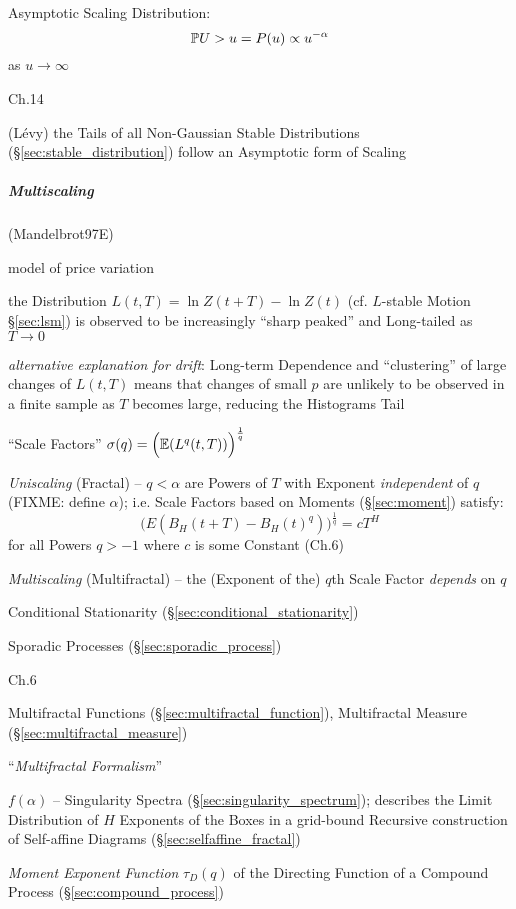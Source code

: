 Asymptotic Scaling Distribution:
\[
  \mathbb{P}{U > u} = P(u) \propto u^{-\alpha}
\]
as $u \to \infty$

Ch.14

(L\'evy) the Tails of all Non-Gaussian Stable Distributions
(\S\ref{sec:stable_distribution}) follow an Asymptotic form of Scaling



\subparagraph{Multiscaling}\label{sec:multiscaling}\hfill

(Mandelbrot97E)

model of price variation

the Distribution $L(t, T) = \ln Z(t + T) - \ln Z(t)$ (cf. $L$-stable Motion
\S\ref{sec:lsm}) is observed to be increasingly ``sharp peaked'' and Long-tailed
as $T \to 0$

\emph{alternative explanation for drift}: Long-term Dependence and
``clustering'' of large changes of $L(t, T)$ means that changes of small $p$ are
unlikely to be observed in a finite sample as $T$ becomes large, reducing the
Histograms Tail

``Scale Factors'' $\sigma(q) = \Big(\mathbb{E}(L^q(t, T))\Big)^{\frac{1}{q}}$

\emph{Uniscaling} (Fractal) -- $q < \alpha$ are Powers of $T$ with Exponent
\emph{independent} of $q$ (FIXME: define $\alpha$); i.e. Scale Factors based on
Moments (\S\ref{sec:moment}) satisfy:
\[
  \Big(E(B_H(t + T) - B_H(t)^q)\Big)^{\frac{1}{q}} = c T^H
\]
for all Powers $q > -1$ where $c$ is some Constant (Ch.6)

\emph{Multiscaling} (Multifractal) -- the (Exponent of the) $q$th Scale Factor
\emph{depends} on $q$

\fist Conditional Stationarity (\S\ref{sec:conditional_stationarity})

\fist Sporadic Processes (\S\ref{sec:sporadic_process})

Ch.6

Multifractal Functions (\S\ref{sec:multifractal_function}), Multifractal Measure
(\S\ref{sec:multifractal_measure})

``\emph{Multifractal Formalism}''

$f(\alpha)$ -- Singularity Spectra (\S\ref{sec:singularity_spectrum}); describes
the Limit Distribution of $H$ Exponents of the Boxes in a grid-bound Recursive
construction of Self-affine Diagrams (\S\ref{sec:selfaffine_fractal})

\emph{Moment Exponent Function} $\tau_D(q)$ of the Directing Function of a
Compound Process (\S\ref{sec:compound_process})


